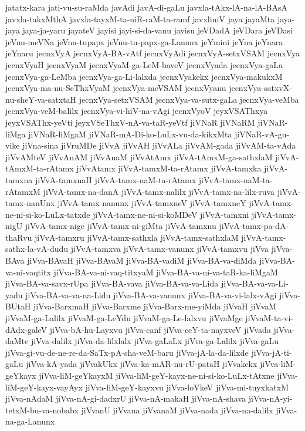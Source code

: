 {jatatx-kara
jati-vu-su-raMda
javAdi
javA-di-gaLu
javxla-tAkx-lA-na-lA-BAsA
javxla-takxMthA
javxla-tayxM-ta-niR-raM-ta-ramf
javxliniV
jaya
jayaMta
jaya-jaya
jaya-ja-yaru
jayateV
jayisi
jayi-si-da-vanu
jayisu
jeVDadA
jeVDara
jeVDasi
jeVnu-meVNa
jeVnu-tupapx
jeVnu-tu-papx-ga-Lanunx
jeYmini
jeYna
jeYnara
jeYnaru
jecnxVyA
jecnxVyA-BA-vAtf
jecnxVyAdi
jecnxVyA-setxVSAM
jecnxVya
jecnxVyaH
jecnxVyaM
jecnxVyaM-ga-LeM-baveV
jecnxVyada
jecnxVya-gaLa
jecnxVya-ga-LeMba
jecnxVya-ga-Li-lalxda
jecnxVyakekx
jecnxVya-makukxM
jecnxVya-ma-nu-SeThxVyaM
jecnxVya-meVSAM
jecnxVyanu
jecnxVya-satxvX-nu-sheY-va-satxtaH
jecnxVya-setxVSAM
jecnxVya-va-sutx-gaLa
jecnxVya-veMba
jecnxVya-veM-balilx
jecnxVya-vi-hiV-na-vAgi
jecnxVyoV
jeyxVSAThxya
jeyxVSAThx-yeVti
jeyxVSeThxV-nA-va-taR-yeVtf
jiVNaR
jiVNaRM
jiVNaR-liMga
jiVNaR-liMgaM
jiVNaR-mA-Di-ko-LuLx-vu-da-kikxMta
jiVNaR-vA-gu-vike
jiVna-sina
jiVruMDe
jiVvA
jiVvAH
jiVvALa
jiVvAM-gada
jiVvAM-ta-vAda
jiVvAMteV
jiVvAnAM
jiVvAnaM
jiVvAtAmx
jiVvA-tAmxM-ga-sathxlaM
jiVvA-tAmxM-ta-rAtamx
jiVvAtamx
jiVvA-tamxM-ta-rAtamx
jiVvA-tamxka
jiVvA-tamxna
jiVvA-tamxnaH
jiVvA-tamx-naM-ta-rAtamx
jiVvA-tamx-naM-ta-rAtamxM
jiVvA-tamx-na-danA
jiVvA-tamx-nalilx
jiVvA-tamx-na-lilx-ruva
jiVvA-tamx-nanUnx
jiVvA-tamx-nanunx
jiVvA-tamxneV
jiVvA-tamxneY
jiVvA-tamx-ne-ni-si-ko-LuLx-tatxde
jiVvA-tamx-ne-ni-si-koMDeV
jiVvA-tamxni
jiVvA-tamx-nigU
jiVvA-tamx-nige
jiVvA-tamx-ni-giMta
jiVvA-tamxnu
jiVvA-tamx-pa-dA-thaRvu
jiVvA-tamxru
jiVvA-tamx-sathxla
jiVvA-tamx-sathxlaM
jiVvA-tamx-sathx-la-vA-dudu
jiVvA-tamxva
jiVvA-tamx-vanunx
jiVvA-tamxvu
jiVva
jiVva-BAva
jiVva-BAvaH
jiVva-BAvaM
jiVva-BA-vadiM
jiVva-BA-va-diMda
jiVva-BA-va-ni-vaqtitx
jiVva-BA-va-ni-vaq-titxyaM
jiVva-BA-va-ni-va-taR-ka-liMgaM
jiVva-BA-va-savx-rUpa
jiVva-BA-vava
jiVva-BA-va-va-Lida
jiVva-BA-va-va-Li-yadu
jiVva-BA-va-va-na-Lidu
jiVva-BA-va-vanunx
jiVva-BA-va-vi-lalx-vAgi
jiVva-BUtaH
jiVva-BarxmaH
jiVva-Barxme
jiVva-Barx-me-yiMda
jiVvaH
jiVvaM
jiVvaM-ga-Lalilx
jiVvaM-ga-LeYdu
jiVvaM-ga-Le-lalxvu
jiVvaMge
jiVvaM-ta-vi-dAdx-galeV
jiVva-bA-hu-Layxvu
jiVva-canf
jiVva-ceY-ta-nayxveV
jiVvada
jiVva-daMte
jiVva-dalilx
jiVva-da-lilxlalx
jiVva-gaLaLx
jiVva-ga-Lalilx
jiVva-gaLu
jiVva-gi-vu-de-ne-re-da-SaTx-pA-sha-veM-baru
jiVva-jA-la-da-lilxde
jiVva-jA-ti-gaLu
jiVva-kA-yada
jiVvakUkx
jiVva-ka-mAR-nu-rU-pataH
jiVvakekx
jiVva-liM-geYkayx
jiVva-liM-geYkayxM
jiVva-liM-geY-kayx-ne-ni-si-ko-LuLx-tAtxne
jiVva-liM-geY-kayx-vayAyx
jiVva-liM-geY-kayxvu
jiVva-loVkeV
jiVva-mi-tuyxkatxM
jiVva-nAdaM
jiVva-nA-gi-dadxrU
jiVva-nA-makaH
jiVva-nA-shava
jiVva-nA-yi-tetxM-bu-va-nobabx
jiVvanU
jiVvana
jiVvanaM
jiVva-nada
jiVva-na-dalilx
jiVva-na-ga-Lanunx
}
